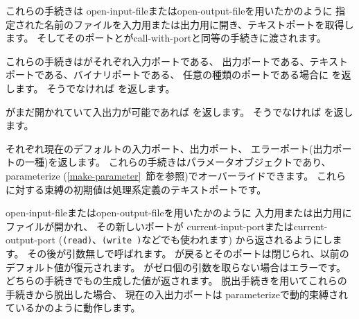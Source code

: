 \begin{entry}{%
}

これらの手続きは
{\cf open-input-file}または{\cf open-\+output-\+file}を用いたかのように
指定された名前のファイルを入力用または出力用に開き、テキストポートを取得します。
そしてそのポートとが{\cf call-\+with-\+port}と同等の手続きに渡されます。
\end{entry}

\begin{entry}{%
}

これらの手続きはがそれぞれ入力ポートである、
出力ポートである、テキストポートである、バイナリポートである、
任意の種類のポートである場合に \schtrue{}を返します。
そうでなければ \schfalse{}を返します。

\end{entry}


\begin{entry}{%
}

がまだ開かれていて入出力が可能であれば %
\schtrue{}を返します。 そうでなければ \schfalse{}を返します。


\end{entry}


\begin{entry}{%
}

それぞれ現在のデフォルトの入力ポート、出力ポート、
エラーポート(出力ポートの一種)を返します。
これらの手続きはパラメータオブジェクトであり、
{\cf parameterize} (\ref{make-parameter}~節を参照)でオーバーライドできます。
これらに対する束縛の初期値は処理系定義のテキストポートです。

\end{entry}


\begin{entry}{%
}

{\cf open-input-file}または{\cf open-output-file}を用いたかのように
入力用または出力用にファイルが開かれ、
その新しいポートが
{\cf current-input-port}または{\cf current-output-port}
({\tt (read)}、{\tt (write )}などでも使われます)
から返されるようにします。
その後が引数無しで呼ばれます。
が戻るとそのポートは閉じられ、以前のデフォルト値が復元されます。
がゼロ個の引数を取らない場合はエラーです。
どちらの手続きでもの生成した値が返されます。
脱出手続きを用いてこれらの手続きから脱出した場合、
現在の入出力ポートは
{\cf parameterize}で動的束縛されているかのように動作します。


\end{entry}


